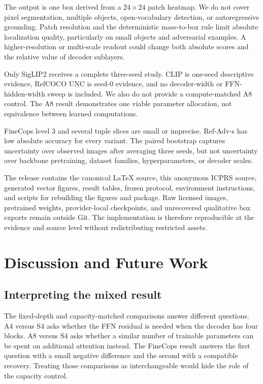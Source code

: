 \documentclass[conference]{IEEEtran}
\begin{document}
The output is one box derived from a $24\times24$ patch heatmap. We do not cover pixel segmentation, multiple objects, open-vocabulary detection, or autoregressive grounding. Patch resolution and the deterministic mass-to-box rule limit absolute localization quality, particularly on small objects and adversarial examples. A higher-resolution or multi-scale readout could change both absolute scores and the relative value of decoder sublayers.

Only SigLIP2 receives a complete three-seed study. CLIP is one-seed descriptive evidence, RefCOCO UNC is seed-0 evidence, and no decoder-width or FFN-hidden-width sweep is included. We also do not provide a compute-matched A8 control. The A8 result demonstrates one viable parameter allocation, not equivalence between learned computations.

FineCops level 3 and several tuple slices are small or imprecise. Ref-Adv-s has low absolute accuracy for every variant. The paired bootstrap captures uncertainty over observed images after averaging three seeds, but not uncertainty over backbone pretraining, dataset families, hyperparameters, or decoder scales.

The release contains the canonical LaTeX source, this anonymous ICPRS source, generated vector figures, result tables, frozen protocol, environment instructions, and scripts for rebuilding the figures and package. Raw licensed images, pretrained weights, provider-local checkpoints, and unrecovered qualitative box exports remain outside Git. The implementation is therefore reproducible at the evidence and source level without redistributing restricted assets.

\section{Discussion and Future Work}
\subsection{Interpreting the mixed result}
The fixed-depth and capacity-matched comparisons answer different questions. A4 versus S4 asks whether the FFN residual is needed when the decoder has four blocks. A8 versus S4 asks whether a similar number of trainable parameters can be spent on additional attention instead. The FineCops result answers the first question with a small negative difference and the second with a compatible recovery. Treating those comparisons as interchangeable would hide the role of the capacity control.
\end{document}
